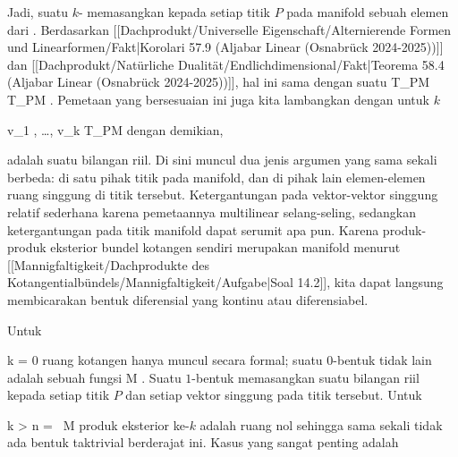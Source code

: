 {}
{

Jadi, suatu $k$-
memasangkan kepada setiap titik $P$ pada manifold sebuah elemen dari
. Berdasarkan
[[Dachprodukt/Universelle Eigenschaft/Alternierende Formen und Linearformen/Fakt|Korolari 57.9 (Aljabar Linear (Osnabrück 2024-2025))]]
dan [[Dachprodukt/Natürliche Dualität/Endlichdimensional/Fakt|Teorema 58.4 (Aljabar Linear (Osnabrück 2024-2025))]],
hal ini sama dengan suatu
\maabbdisp {} {T_PM \times \cdots \times T_PM } { \R
} {.}
Pemetaan yang bersesuaian ini juga kita lambangkan dengan
 untuk $k$

\mavergleichskette
{\vergleichskette
{ v_1 , \ldots , v_k
}
{ \in }{ T_PM
}
{  }{
}
{    }{
}
{   }{
}
}
{}{}{}
dengan demikian,

 {  }

adalah suatu bilangan riil. Di sini muncul dua jenis argumen yang sama sekali berbeda: di satu pihak titik pada manifold, dan di pihak lain elemen-elemen ruang singgung di titik tersebut. Ketergantungan pada vektor-vektor singgung relatif sederhana karena pemetaannya multilinear selang-seling, sedangkan ketergantungan pada titik manifold dapat serumit apa pun. Karena produk-produk eksterior bundel kotangen sendiri merupakan manifold menurut
[[Mannigfaltigkeit/Dachprodukte des Kotangentialbündels/Mannigfaltigkeit/Aufgabe|Soal 14.2]],
kita dapat langsung membicarakan bentuk diferensial yang kontinu atau
 {} {}
diferensiabel.

Untuk

\mavergleichskette
{\vergleichskette
{ k
}
{ = }{ 0
}
{  }{
}
{    }{
}
{   }{
}
}
{}{}{}
ruang kotangen hanya muncul secara formal; suatu $0$-bentuk tidak lain adalah sebuah fungsi
 { M } {\R
} {.}
Suatu $1$-bentuk
 {} {}
memasangkan suatu bilangan riil kepada setiap titik $P$ dan setiap vektor singgung pada titik tersebut. Untuk

\mavergleichskette
{\vergleichskette
{k
}
{ > }{ n
}
{ = }{  \, M
}
{    }{
}
{   }{
}
}
{}{}{}
produk eksterior ke-$k$ adalah ruang nol sehingga sama sekali tidak ada bentuk taktrivial berderajat ini. Kasus yang sangat penting adalah

}
